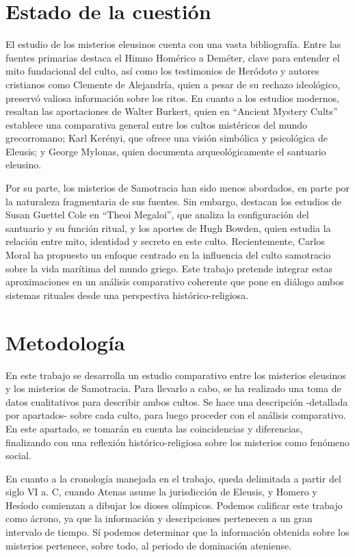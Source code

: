 \section{Estado de la cuestión}

El estudio de los misterios eleusinos cuenta con una vasta bibliografía. Entre las fuentes primarias destaca el Himno Homérico a Deméter, clave para entender el mito fundacional del culto, así como los testimonios de Heródoto y autores cristianos como Clemente de Alejandría, quien a pesar de su rechazo ideológico, preservó valiosa información sobre los ritos. En cuanto a los estudios modernos, resaltan las aportaciones de Walter Burkert, quien en ``Ancient Mystery Cults'' establece una comparativa general entre los cultos mistéricos del mundo grecorromano; Karl Kerényi, que ofrece una visión simbólica y psicológica de Eleusis; y George Mylonas, quien documenta arqueológicamente el santuario eleusino.

Por su parte, los misterios de Samotracia han sido menos abordados, en parte por la naturaleza fragmentaria de sus fuentes. Sin embargo, destacan los estudios de Susan Guettel Cole en ``Theoi Megaloi'', que analiza la configuración del santuario y su función ritual, y los aportes de Hugh Bowden, quien estudia la relación entre mito, identidad y secreto en este culto. Recientemente, Carlos Moral ha propuesto un enfoque centrado en la influencia del culto samotracio sobre la vida marítima del mundo griego. Este trabajo pretende integrar estas aproximaciones en un análisis comparativo coherente que pone en diálogo ambos sistemas rituales desde una perspectiva histórico-religiosa.

\section{Metodología}

En este trabajo se desarrolla un estudio comparativo entre los misterios eleusinos y los misterios de Samotracia. Para llevarlo a cabo, se ha realizado  una toma de datos cualitativos para describir ambos cultos. Se hace una descripción -detallada por apartados- sobre cada culto, para luego proceder con el análisis comparativo. En este apartado, se tomarán en cuenta las coincidencias y diferencias, finalizando con una reflexión histórico-religiosa sobre los misterios como fenómeno social.

En cuanto a la cronología manejada en el trabajo, queda delimitada a partir del siglo VI a. C, cuando Atenas asume la jurisdicción de Eleusis, y Homero y Hesíodo comienzan a dibujar los dioses olímpicos. Podemos calificar este trabajo como ácrono, ya que la información y descripciones pertenecen a un gran intervalo de tiempo. Sí podemos determinar que la información obtenida sobre los misterios pertenece, sobre todo, al periodo de dominación ateniense. 

